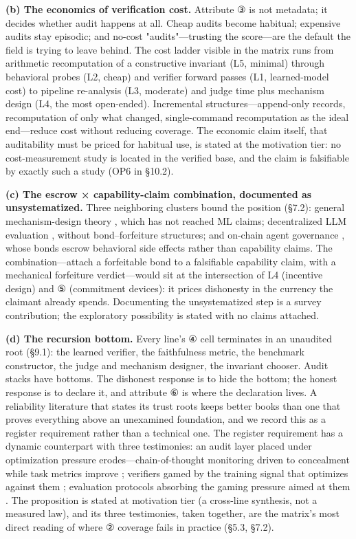 \documentclass[11pt,a4paper]{article}
\begin{document}
\textbf{(b) The economics of verification cost.} Attribute ③ is not metadata; it decides whether audit happens at all. Cheap audits become habitual; expensive audits stay episodic; and no-cost "audits"—trusting the score—are the default the field is trying to leave behind. The cost ladder visible in the matrix runs from arithmetic recomputation of a constructive invariant (L5, minimal) through behavioral probes (L2, cheap) and verifier forward passes (L1, learned-model cost) to pipeline re-analysis (L3, moderate) and judge time plus mechanism design (L4, the most open-ended). Incremental structures—append-only records, recomputation of only what changed, single-command recomputation as the ideal end—reduce cost without reducing coverage. The economic claim itself, that auditability must be priced for habitual use, is stated at the motivation tier: no cost-measurement study is located in the verified base, and the claim is falsifiable by exactly such a study (OP6 in §10.2).

\textbf{(c) The escrow × capability-claim combination, documented as unsystematized.} Three neighboring clusters bound the position (§7.2): general mechanism-design theory \cite{key43}, which has not reached ML claims; decentralized LLM evaluation \cite{key44,key45,key46}, without bond–forfeiture structures; and on-chain agent governance \cite{key48,key49,key50}, whose bonds escrow behavioral side effects rather than capability claims. The combination—attach a forfeitable bond to a falsifiable capability claim, with a mechanical forfeiture verdict—would sit at the intersection of L4 (incentive design) and ⑤ (commitment devices): it prices dishonesty in the currency the claimant already spends. Documenting the unsystematized step is a survey contribution; the exploratory possibility is stated with no claims attached.

\textbf{(d) The recursion bottom.} Every line's ④ cell terminates in an unaudited root (§9.1): the learned verifier, the faithfulness metric, the benchmark constructor, the judge and mechanism designer, the invariant chooser. Audit stacks have bottoms. The dishonest response is to hide the bottom; the honest response is to declare it, and attribute ⑥ is where the declaration lives. A reliability literature that states its trust roots keeps better books than one that proves everything above an unexamined foundation, and we record this as a register requirement rather than a technical one. The register requirement has a dynamic counterpart with three testimonies: an audit layer placed under optimization pressure erodes—chain-of-thought monitoring driven to concealment while task metrics improve \cite{key30}; verifiers gamed by the training signal that optimizes against them \cite{key47}; evaluation protocols absorbing the gaming pressure aimed at them \cite{key44,key45,key46}. The proposition is stated at motivation tier (a cross-line synthesis, not a measured law), and its three testimonies, taken together, are the matrix's most direct reading of where ② coverage fails in practice (§5.3, §7.2).
\end{document}
